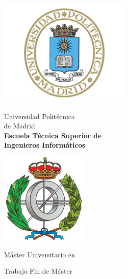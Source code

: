 \begin{titlepage}

\begin{minipage}{0.15\linewidth}
\hspace*{-2.5cm}
\noindent
\includegraphics[scale=0.5]{include/EscUpm.png} \qquad\qquad
\end{minipage}
\begin{minipage}{0.7\linewidth}
\begin{center}
\huge{ Universidad Politécnica\\de Madrid }\\
\vspace*{0.5cm}
\Large{\textbf{Escuela Técnica Superior de \\
Ingenieros Informáticos}}
\end{center}
\end{minipage}
\begin{minipage}{0.2\linewidth}
\includegraphics[scale=0.5]{include/FacInformatica.png} 
\end{minipage}

\vspace*{1cm}
\begin{center}
\Large{Máster Universitario en  \Master{} }
\end{center}

\vspace*{1cm}
\begin{center}
\huge{ Trabajo Fin de Máster }
\end{center}


\end{titlepage}
